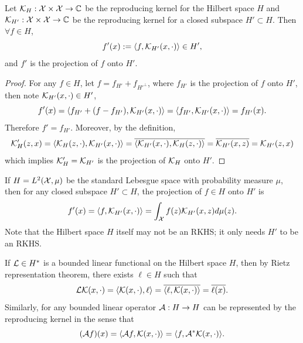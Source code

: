 \begin{theorem}
    Let $\mathcal K_{H}:\mathcal X\times \mathcal X \to \mathbb C$ be the reproducing kernel for the Hilbert space $H$ and $\mathcal K_{H'}: \mathcal X\times \mathcal X \to \mathbb C$ be the reproducing kernel for a closed subspace $H'\subset H$. Then $\forall f\in H$,  
    \begin{equation}
        f'(x) := \langle {f, \mathcal K_{H'}(x, \cdot)} \rangle \in H',
    \end{equation}
    and $f'$ is the projection of $f$ onto $H'$.
\end{theorem}
\begin{proof}
    For any $f\in  H$, let $f = f_{H'} + f_{H'^{\perp}}$, where $f_{H'}$ is the projection of $f$ onto $H'$, then note $\mathcal K_{H'}(x, \cdot)\in H'$,  
    \begin{equation}
        f'(x) = \langle {f_{H'} + (f - f_{H'}), \mathcal K_{H'}(x, \cdot)} \rangle = \langle {f_{H'}, \mathcal K_{H'}(x, \cdot)} \rangle = f_{H'}(x). 
    \end{equation}
    Therefore $f' = f_{H'}$. Moreover, by the definition, 
    \begin{equation}
        \mathcal K'_{H}(z, x) = \langle {\mathcal K_{H}(z, \cdot), \mathcal K_{H'}(x, \cdot)} \rangle = \overline{ \langle {\mathcal K_{H'}(x, \cdot), \mathcal K_{H}(z, \cdot)} \rangle } = \overline{\mathcal K_{H'}(x, z)} = \mathcal K_{H'}(z, x) 
    \end{equation}
    which implies $\mathcal K'_{H}=\mathcal K_{H'}$ is the projection of $\mathcal K_{H}$ onto $H'$.
\end{proof}
\begin{example}
    If $H = L^2(\mathcal X, \mu)$ be the standard Lebesgue space with probability measure $\mu$, then for any closed subspace $H'\subset H$, the projection of $f\in H$ onto $H'$ is
    \begin{equation}
        f'(x) = \langle {f, \mathcal K_{H'}(x, \cdot)} \rangle = \int_{\mathcal X} f(z) \mathcal K_{H'}(x, z) d\mu(z). 
    \end{equation}
    Note that the Hilbert space $H$ itself may not be an RKHS; it only needs $H'$ to be an RKHS. 
\end{example}
\begin{example}
    If $\mathcal L\in H^{\ast}$ is a bounded linear functional on the Hilbert space $H$, then by Rietz representation theorem, there exists $\ell\in H$ such that
    \begin{equation}
        \mathcal L \mathcal K(x, \cdot) = \langle {\mathcal K(x, \cdot), \ell} \rangle = \overline{\langle {\ell, \mathcal K(x,\cdot)} \rangle} = \overline{\ell(x)}.  
    \end{equation}
    Similarly, for any bounded linear operator $\mathcal A: H\to H$ can be represented by the reproducing kernel in the sense that 
    \begin{equation}
        (\mathcal A f)(x) = \langle {\mathcal Af, \mathcal K(x, \cdot)} \rangle = \langle {f, \mathcal A^{\ast} \mathcal K(x,\cdot)} \rangle. 
    \end{equation}
\end{example}
